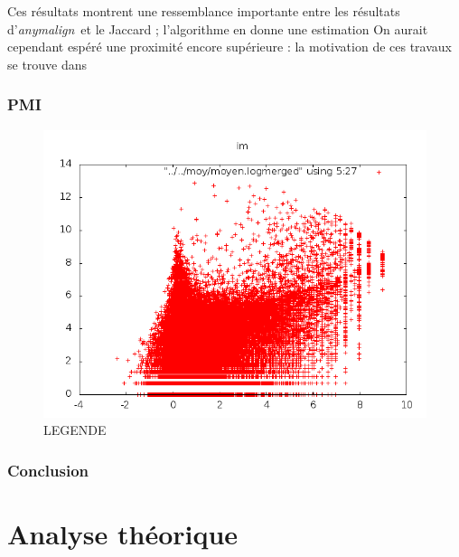 \documentclass[a4paper,10pt]{article}
\newcommand{\anym}{\emph{anymalign}}
\begin{document}
Ces résultats montrent une ressemblance importante entre les résultats d'\anym~et le Jaccard ; l'algorithme en donne une estimation
On aurait cependant espéré une proximité encore supérieure : la motivation de ces travaux se trouve dans %


\subsubsection{PMI}



\begin{figure}[t]
\centering
\label{im}
\includegraphics[width=12cm]{imlog.png} %
\caption{LEGENDE} %
\end{figure}


\subsubsection{Conclusion}


\section{Analyse théorique}
\end{document}
